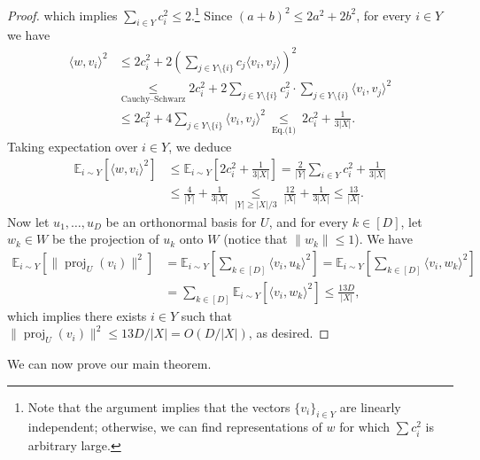 \documentclass[10pt,a4paper]{article}
\begin{document}
\begin{proof}
which implies $\sum_{i\in Y}c_i^2\leq2$.\footnote{Note that the argument implies that the vectors $\{v_i\}_{i\in Y}$ are linearly independent; otherwise, we can find representations of $w$ for which $\sum c_i^2$ is arbitrary large.} Since $(a+b)^2\leq2a^2+2b^2$, for every $i\in Y$ we have
\begin{align*}\langle w,v_i\rangle^2&\leq2c_i^2+2\left(\sum_{j\in Y\setminus\{i\}}c_j\langle v_i,v_j\rangle\right)^2\\&\underset{\text{Cauchy--Schwarz}}\leq2c_i^2+2\sum_{j\in Y\setminus\{i\}}c_j^2\cdot\sum_{j\in Y\setminus\{i\}}\langle v_i,v_j\rangle^2\\&\leq2c_i^2+4\sum_{j\in Y\setminus\{i\}}\langle v_i,v_j\rangle^2\ \underset{\text{Eq.(1)}}\leq\ 2c_i^2+\frac1{3|X|}.\end{align*}
Taking expectation over $i\in Y$, we deduce
\begin{align*}\mathbb E_{i\sim Y}[\langle w,v_i\rangle^2]&\leq\mathbb E_{i\sim Y}\left[2c_i^2+\frac1{3|X|}\right]=\frac2{|Y|}\sum_{i\in Y}c_i^2+\frac1{3|X|}\\&\leq\frac4{|Y|}+\frac1{3|X|}\ \underset{|Y|\geq|X|/3}\leq\ \frac{12}{|X|}+\frac1{3|X|}\leq\frac{13}{|X|}.\end{align*}
Now let $u_1,\ldots,u_D$ be an orthonormal basis for $U$, and for every $k\in[D]$, let $w_k\in W$ be the projection of $u_k$ onto $W$ (notice that $\|w_k\|\leq1$). We have
\begin{align*}\mathbb E_{i\sim Y}[\|\operatorname{proj}_U(v_i)\|^2]&=\mathbb E_{i\sim Y}\left[\sum_{k\in[D]}\langle v_i,u_k\rangle^2\right]=\mathbb E_{i\sim Y}\left[\sum_{k\in[D]}\langle v_i,w_k\rangle^2\right]\\&=\sum_{k\in[D]}\mathbb E_{i\sim Y}[\langle v_i,w_k\rangle^2]\leq\frac{13D}{|X|},\end{align*}
which implies there exists $i\in Y$ such that $\|\operatorname{proj}_U(v_i)\|^2\leq13D/|X|=O(D/|X|)$, as desired.
\end{proof}
We can now prove our main theorem.
\end{document}
